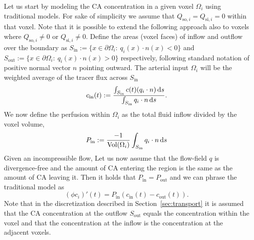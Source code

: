 \documentclass[journal,twocolumn]{IEEEtran}
\begin{document}
	Let us start by modeling the CA concentration in a given voxel $\Omega_i$ using traditional models.
	For sake of simplicity we assume that $Q_{\mathrm{so},i} = Q_{\mathrm{si},i} = 0$ within that voxel.
	Note that it is possible to extend the following approach also to voxels where $Q_{\mathrm{so},i} \neq 0$ or $Q_{\mathrm{si},i} \neq 0$.
	Define the areas (voxel faces) of inflow and outflow over the boundary as $S_{\mathrm{in}} := \{ x \in \partial \Omega_i: \ q_i(x) \cdot n(x) < 0 \}$ and $S_{\mathrm{out}}:= \{ x \in \partial \Omega_i: \ q_i(x) \cdot n(x) > 0 \}$ respectively, following standard notation of positive normal vector $n$ pointing outward.
	The arterial input $\Omega_i$ will be the weighted average of the tracer flux across $S_{\mathrm{in}}$ 
	\begin{equation}\label{eq:cin}
	 	c_{\mathrm{in}}(t):= \frac{\int_{S_{\mathrm{in}}}c(t)(q_i \cdot n) \diffint s}{\int_{S_{\mathrm{in}}} q_i \cdot n \diffint s}.
	\end{equation}
	We now define the perfusion within $\Omega_i$ as the total fluid inflow divided by the voxel volume,
	\begin{equation}\label{eq:perflocal}
		P_{\mathrm{in}} :=\frac{-1}{\mathrm{Vol}( \Omega_i)}\int_{S_{\mathrm{in}}} q_i \cdot n \diffint s 
	\end{equation}
	Given an incompressible flow, Let us now assume that the flow-field $q$ is divergence-free and the amount of CA entering the region is the same as the amount of CA leaving it. 
	Then it holds that $P_{\mathrm{in}}=P_{\mathrm{out}}$ and we can phrase the traditional model as
	\begin{equation}\label{eq:singlevoxel}
		(\phi c_i)'(t)  = P_{\mathrm{in}} (c_\mathrm{in}(t)  - c_\mathrm{out}(t)).
	\end{equation}
	Note that in the discretization described in Section~\ref{sec:transport} it is assumed that the CA concentration at the outflow $S_\mathrm{out}$ equals the concentration within the voxel and that the concentration at the inflow is the concentration at the adjacent voxels.
\end{document}
